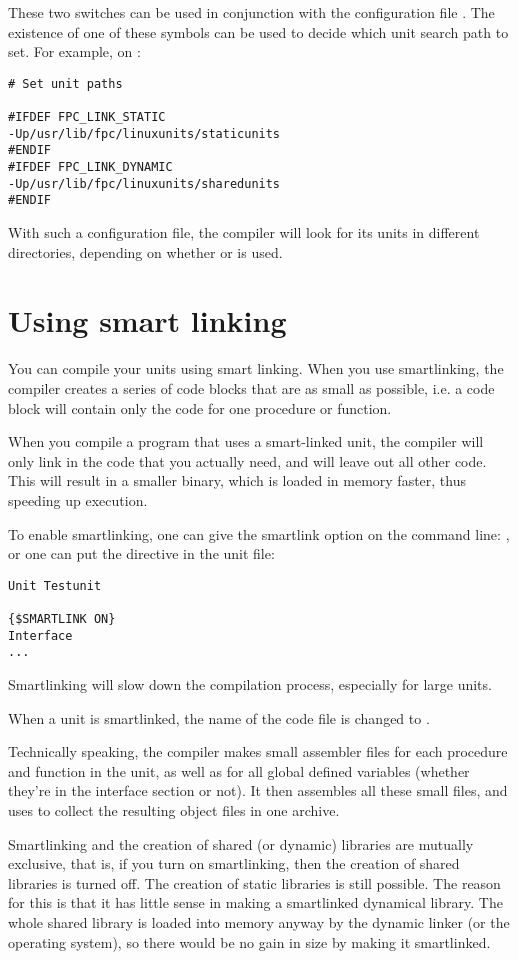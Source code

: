 These two switches can be used in conjunction with the configuration file
. The existence of one of these symbols can be used to
decide which unit search path to set. For example, on \linux:
\begin{verbatim}
# Set unit paths

#IFDEF FPC_LINK_STATIC
-Up/usr/lib/fpc/linuxunits/staticunits
#ENDIF
#IFDEF FPC_LINK_DYNAMIC
-Up/usr/lib/fpc/linuxunits/sharedunits
#ENDIF
\end{verbatim}
With such a configuration file, the compiler will look for its units in
different directories, depending on whether  or  is used.

\section{Using smart linking}
\label{se:SmartLinking}

You can compile your units using smart linking. When you use smartlinking,
the compiler creates a series of code blocks that are as small as possible,
i.e. a code block will contain only the code for one procedure or function.

When you compile a program that uses a smart-linked unit, the compiler will
only link in the code that you actually need, and will leave out all other
code. This will result in a smaller binary, which is loaded in memory
faster, thus speeding up execution.

To enable smartlinking, one can give the smartlink option on the command
line: , or one can put the  directive in
the unit file:
\begin{verbatim}
Unit Testunit

{$SMARTLINK ON}
Interface
...
\end{verbatim}
Smartlinking will slow down the compilation process, especially for large
units.

When a unit  is smartlinked, the name of the code file is
changed to .

Technically speaking, the compiler makes small assembler files for each
procedure and function in the unit, as well as for all global defined
variables (whether they're in the interface section or not). It then
assembles all these small files, and uses  to collect the resulting
object files in one archive.

Smartlinking and the creation of shared (or dynamic) libraries are mutually
exclusive, that is, if you turn on smartlinking, then the creation of shared
libraries is turned off. The creation of static libraries is still possible.
The reason for this is that it has little sense in making a smartlinked
dynamical library. The whole shared library is loaded into memory anyway by
the dynamic linker (or the operating system), so there would be no gain in size by
making it smartlinked.




